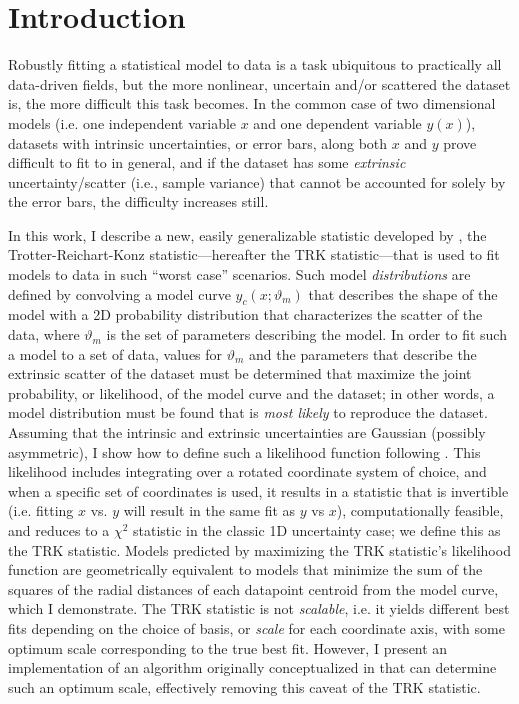 \chapter{Introduction}
\label{cha:section_introduction}
Robustly fitting a statistical model to data is a task ubiquitous to practically all data-driven fields, but the more nonlinear, uncertain and/or scattered the dataset is, the more difficult this task becomes. In the common case of two dimensional models (i.e. one independent variable $x$ and one dependent variable $y(x)$), datasets with intrinsic uncertainties, or error bars, along both $x$ and $y$ prove difficult to fit to in general, and if the dataset has some \textit{extrinsic} uncertainty/scatter (i.e., sample variance) that cannot be accounted for solely by the error bars, the difficulty increases still.

In this work, I describe a new, easily generalizable statistic developed by \textcite{trotter}, the Trotter-Reichart-Konz statistic---hereafter the TRK statistic---that is used to fit models to data in such ``worst case'' scenarios. Such model \textit{distributions} are defined by convolving a model curve $y_c(x;\vartheta_m)$ that describes the shape of the model with a 2D probability distribution that characterizes the scatter of the data, where $\vartheta_m$ is the set of parameters describing the model. In order to fit such a model to a set of data, values for $\vartheta_m$ and the parameters that describe the extrinsic scatter of the dataset must be determined that maximize the joint probability, or likelihood, of the model curve and the dataset; in other words, a model distribution must be found that is \textit{most likely} to reproduce the dataset. Assuming that the intrinsic and extrinsic uncertainties are Gaussian (possibly asymmetric), I show how to define such a likelihood function following \textcite{trotter}. This likelihood includes integrating over a rotated coordinate system of choice, and when a specific set of coordinates is used, it results in a statistic that is invertible (i.e. fitting $x$ vs. $y$ will result in the same fit as $y$ vs $x$), computationally feasible, and reduces to a $\chi^2$ statistic in the classic 1D uncertainty case; we define this as the TRK statistic. Models predicted by maximizing the TRK statistic's likelihood function are geometrically equivalent to models that minimize the sum of the squares of the radial distances of each datapoint centroid from the model curve, which I demonstrate. The TRK statistic is not \textit{scalable}, i.e. it yields different best fits depending on the choice of basis, or \textit{scale} for each coordinate axis, with some optimum scale corresponding to the true best fit. However, I present an implementation of an algorithm originally conceptualized in \textcite{trotter} that can determine such an optimum scale, effectively removing this caveat of the TRK statistic. 

